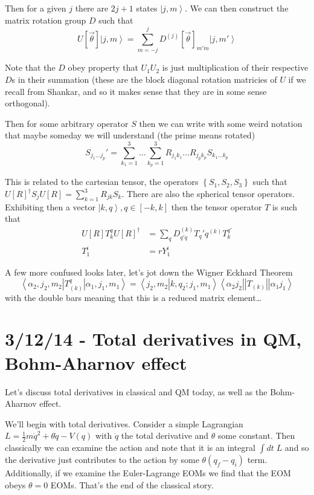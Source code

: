 \documentclass[10pt]{report}
\newcommand{\bra}[1]{\left<#1\right|}
\newcommand{\ket}[1]{\left|#1\right>}
\newcommand{\dotp}[2]{\left<#1\left.\right|#2\right>}
\newcommand{\abs}[1]{\left|#1\right|}
\begin{document}
Then for a given $j$ there are $2j + 1$ states $\ket{j,m}$. We can then construct the matrix rotation group $D$ such that
\begin{equation}
    U[\vec{\theta}]\ket{j,m} = \sum_{m=-j}^{j}D^{(j)}[\vec{\theta}]_{m'm}\ket{j,m'}
\end{equation}

Note that the $D$ obey property that $U_1U_2$ is just multiplication of their respective $D$s in their summation (these are the block diagonal rotation matricies of $U$ if we recall from Shankar, and so it makes sense that they are in some sense orthogonal). 

Then for some arbitrary operator $S$ then we can write with some weird notation that maybe someday we will understand (the prime means rotated)
\begin{equation}
    S_{j_1\dots j_p}' = \sum_{k_1 = 1}^{3} \dots \sum_{k_p = 1}^{3}R_{j_1k_1}\dots R_{j_pk_p}S_{k_1\dots k_p}
\end{equation}

This is related to the cartesian tensor, the operators $\left\{ S_1, S_2, S_3 \right\}$ such that $U[R]^\dagger S_j U[R] = \sum_{k=1}^{3}R_{jk}S_k$. There are also the spherical tensor operators. Exhibiting then a vector $\ket{k,q}, q \in [-k,k]$ then the tensor operator $T$ is such that
\begin{align}
    U[R]T_k^qU[R]^\dagger &= \sum_{q}^{}D_{q'q}^{(k)} T_q'q^{(k)}T_k^{q'}\\
    T_1^i &= rY_1^i
\end{align}

A few more confused looks later, let's jot down the Wigner Eckhard Theorem
\begin{equation}
    \bra{\alpha_2, j_2,m_2}T_{(k)}^q\ket{\alpha_1, j_1, m_1} = \dotp{j_2, m_2}{k, q_2; j_1, m_1}\bra{\alpha_2j_2}\abs{T_{(k)}}\ket{\alpha_1j_1}
\end{equation}
with the double bars meaning that this is a reduced matrix element\dots

\chapter{3/12/14 - Total derivatives in QM, Bohm-Aharnov effect}

Let's discuss total derivatives in classical and QM today, as well as the Bohm-Aharnov effect.

We'll begin with total derivatives. Consider a simple Lagrangian $L = \frac{1}{2}m\dot{q}^2 + \theta \dot{q} - V(q)$ with $\dot{q}$ the total derivative and $\theta$ some constant. Then classically we can examine the action and note that it is an integral $\int dt \; L$ and so the derivative just contributes to the action by some $\theta(q_f - q_i)$ term. Additionally, if we examine the Euler-Lagrange EOMs we find that the EOM obeys $\theta = 0$ EOMs. That's the end of the classical story.
\end{document}
